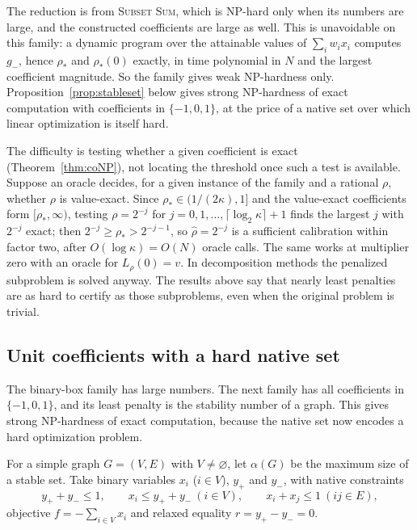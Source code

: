 \begin{remark}\label{rem:weak}
The reduction is from \textsc{Subset Sum}, which is NP-hard only when its
numbers are large, and the constructed coefficients are large as well. This
is unavoidable on this family: a dynamic program over the attainable values
of $\sum_iw_ix_i$ computes $g_-$, hence $\rho_*$ and $\rho_*(0)$ exactly, in
time polynomial in $N$ and the largest coefficient magnitude. So the family
gives weak NP-hardness only. Proposition~\ref{prop:stableset} below gives
strong NP-hardness of exact computation with coefficients in
$\{-1,0,1\}$, at the price of a native set over which linear optimization
is itself hard.
\end{remark}

\begin{remark}\label{rem:hardnesslocation}
The difficulty is testing whether a given coefficient is exact
(Theorem~\ref{thm:coNP}), not locating the threshold once such a test is
available. Suppose an oracle decides, for a given instance of the family and
a rational $\rho$, whether $\rho$ is value-exact. Since
$\rho_*\in(1/(2\kappa),1]$ and the value-exact coefficients form
$[\rho_*,\infty)$, testing $\rho=2^{-j}$ for
$j=0,1,\ldots,\lceil\log_2\kappa\rceil+1$ finds the largest $j$ with
$2^{-j}$ exact; then $2^{-j}\ge\rho_*>2^{-j-1}$, so $\widehat\rho=2^{-j}$ is
a sufficient calibration within factor two, after $O(\log\kappa)=O(N)$
oracle calls. The same works at multiplier zero with an oracle for
$L_\rho(0)=v$. In decomposition methods the penalized subproblem is solved
anyway. The results above say that nearly least penalties are as hard to
certify as those subproblems, even when the original problem is trivial.
\end{remark}

\subsection{Unit coefficients with a hard native set}
The binary-box family has large numbers. The next family has all
coefficients in $\{-1,0,1\}$, and its least penalty is the stability number
of a graph. This gives strong NP-hardness of exact computation, because the
native set now encodes a hard optimization problem.

For a simple graph $G=(V,E)$ with $V\ne\varnothing$, let $\alpha(G)$ be the
maximum size of a stable set. Take binary variables $x_i$ ($i\in V$),
$y_+$ and $y_-$, with native constraints
\begin{equation}\label{eq:stablemodel}
 y_++y_-\le1,\qquad x_i\le y_++y_-\ (i\in V),\qquad
 x_i+x_j\le1\ (ij\in E),
\end{equation}
objective $f=-\sum_{i\in V}x_i$ and relaxed equality $r=y_+-y_-=0$.

